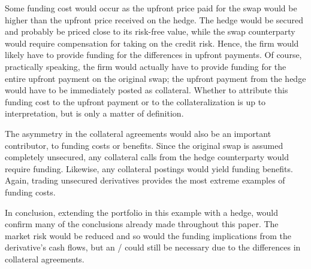 \documentclass[main.tex]{subfiles}
\begin{document}
        Some funding cost would occur as the upfront price paid for the swap 
        would be higher than the upfront price received on the hedge.
        The hedge would be secured and probably be priced close to its risk-free value, 
        while the swap counterparty would require compensation for taking on the credit risk.
        Hence, the firm would likely have to provide funding 
        for the differences in upfront payments.
        Of course, practically speaking, the firm would actually have to provide funding
        for the entire upfront payment on the original swap;
        the upfront payment from the hedge would have to be immediately posted as collateral.
        Whether to attribute this funding cost to the upfront payment or to the collateralization
        is up to interpretation, but is only a matter of definition.

        The asymmetry in the collateral agreements would also be an important contributor,
        to funding costs or benefits.
        Since the original swap is assumed completely unsecured, 
        any collateral calls from the hedge counterparty would require funding.
        Likewise, any collateral postings would yield funding benefits.
        Again, trading unsecured derivatives provides the most extreme examples of funding costs.

        In conclusion, extending the portfolio in this example with a hedge,
        would confirm many of the conclusions already made throughout this paper.
        The market risk would be reduced and so would the funding implications 
        from the derivative's cash flows,
        but an \FVA/ could still be necessary due to the differences in collateral agreements.
\end{document}
